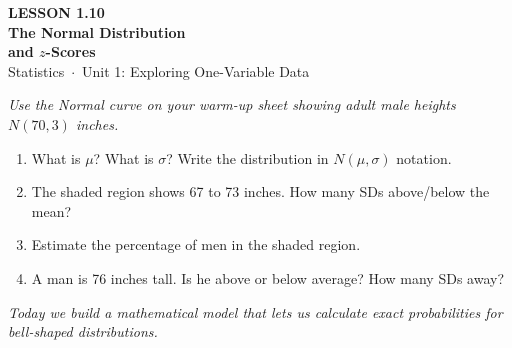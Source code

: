 \documentclass[aspectratio=169, 11pt]{beamer}
\begin{document}
{
\begin{frame}[plain]
  \vspace{2.8cm}
  \hspace{0.55cm}%
  \begin{minipage}{0.9\textwidth}
    {\color{goldacc}\bfseries\small LESSON 1.10}\\[0.5cm]
    {\color{white}\bfseries\LARGE The Normal Distribution\\[0.25cm]
      and $z$-Scores}\\[1.4cm]
    {\color{skymid}\small Statistics~$\cdot$~Unit 1: Exploring One-Variable Data}
  \end{minipage}
\end{frame}
}

{
\begin{frame}[t, plain]
  \vspace{1em}%
  \hspace{0.55cm}%
  \begin{minipage}{0.9\textwidth}
    \small
    \textit{Use the Normal curve on your warm-up sheet showing adult male heights
    $N(70, 3)$ inches.}

    \vspace{0.5em}
    \begin{enumerate}
      \setlength{\itemsep}{0.6em}\setlength{\topsep}{0em}
      \item What is $\mu$? What is $\sigma$? Write the distribution in $N(\mu,\sigma)$ notation.
      \item The shaded region shows 67 to 73 inches. How many SDs above/below the mean?
      \item Estimate the percentage of men in the shaded region.
      \item A man is 76 inches tall. Is he above or below average? How many SDs away?
    \end{enumerate}
    \vspace{0.4cm}
    {\color{navy}\itshape\small
      Today we build a mathematical model that lets us calculate exact
      probabilities for bell-shaped distributions.}
  \end{minipage}
\end{frame}
}
\end{document}
